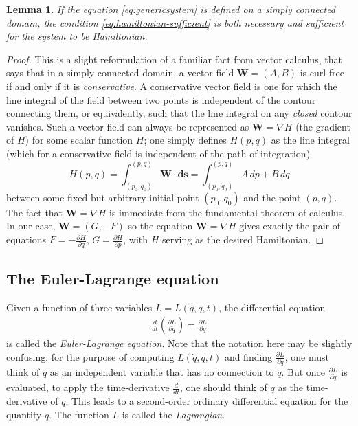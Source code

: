\documentclass[12pt]{amsart}
\newcommand{\eq}[1]{\begin{equation}\begin{split}#1\end{split}\end{equation}}
\newcommand{\grad}{\nabla}
\newtheorem{lem}[thm]{Lemma}
\begin{document}
\begin{lem} \label{lem:hamiltonian-div}
If the equation \eqref{eq:genericsystem} is defined on a simply connected domain, the condition \eqref{eq:hamiltonian-sufficient} is both necessary and sufficient for the system to be Hamiltonian.
\end{lem}

\begin{proof} This is a slight reformulation of a familiar fact from vector calculus, that says that in a simply connected domain, a vector field $\mathbf{W}=(A,B)$ is curl-free if and only if it is \emph{conservative}. A conservative vector field is one for which the line integral of the field between two points is independent of the contour connecting them, or equivalently, such that the line integral on any \emph{closed} contour vanishes. Such a vector field can always be represented as $\mathbf{W} = \grad H$ (the gradient of $H$) for some scalar function $H$; one simply defines $H(p,q)$ as the line integral (which for a conservative field is independent of the path of integration)
$$ H(p,q) = \int_{(p_0,q_0)}^{(p,q)} \mathbf{W}\cdot \mathbf{ds} = \int_{(p_0,q_0)}^{(p,q)} A\,dp + B\,dq
$$
between some fixed but arbitrary initial point $(p_0,q_0)$ and the point $(p,q)$. The fact that $\mathbf{W}=\grad H$ is immediate from the fundamental theorem of calculus. In our case, $\mathbf{W}=(G,-F)$ so the equation $\mathbf{W}=\grad H$ gives exactly the pair of equations $F=-\frac{\partial H}{\partial q}$, $G=\frac{\partial H}{\partial p}$, with $H$ serving as the desired Hamiltonian.
\end{proof}


\subsection{The Euler-Lagrange equation} Given a function of three variables $L=L(\dot{q},q,t)$, the differential equation
\eq{ \label{eq:euler-lagrange}
\frac{d}{dt}\left( \frac{\partial L}{\partial \dot{q}} \right) = \frac{\partial L}{\partial q}
}
is called the \emph{Euler-Lagrange equation}. Note that the notation here may be slightly confusing: for the purpose of computing $L(\dot{q},q,t)$ and finding $\frac{\partial L}{\partial \dot{q}}$, one must think of $\dot{q}$ as an independent variable that has no connection to $q$. But once $\frac{\partial L}{\partial \dot{q}}$ is evaluated, to apply the time-derivative $\frac{d}{dt}$, one should think of $\dot{q}$ as the time-derivative of $q$. This leads to a second-order ordinary differential equation for the quantity $q$. The function $L$ is called the \emph{Lagrangian}.
\end{document}
